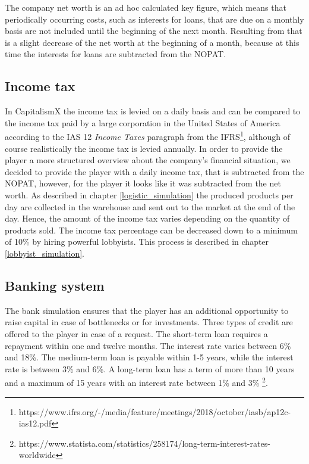
The company net worth is an ad hoc calculated key figure, which means that periodically occurring costs, such as interests for loans, that are due on a monthly basis are not included until the beginning of the next month. Resulting from that is a slight decrease of the net worth at the beginning of a month, because at this time the interests for loans are subtracted from the NOPAT.
 
\subsection{Income tax}

In CapitalismX the income tax is levied on a daily basis and can be compared to the income tax paid by a large corporation in the United States of America according to the IAS 12 \textit{Income Taxes} paragraph from the IFRS\footnote{https://www.ifrs.org/-/media/feature/meetings/2018/october/iasb/ap12c-ias12.pdf}, although of course realistically the income tax is levied annually. In order to provide the player a more structured overview about the company’s financial situation, we decided to provide the player with a daily income tax, that is subtracted from the NOPAT, however, for the player it looks like it was subtracted from the net worth. As described in chapter \ref{logistic_simulation} the produced products per day are collected in the warehouse and sent out to the market at the end of the day. Hence, the amount of the income tax varies depending on the quantity of products sold. The income tax percentage can be decreased down to a minimum of 10\% by hiring powerful lobbyists. This process is described in chapter \ref{lobbyist_simulation}.

\subsection{Banking system}

The bank simulation ensures that the player has an additional opportunity to raise capital in case of bottlenecks or for investments. Three types of credit are offered to the player in case of a request. 
The short-term loan requires a repayment within one and twelve months. The interest rate varies between 6\% and 18\%. The medium-term loan is payable within 1-5 years, while the interest rate is between 3\% and 6\%. A long-term loan has a term of more than 10 years and a maximum of 15 years with an interest rate between 1\% and 3\% \footnote{https://www.statista.com/statistics/258174/long-term-interest-rates-worldwide}. 


